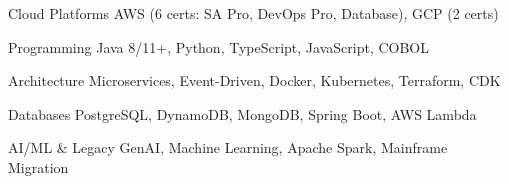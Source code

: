 \vspace{-1mm}
\begin{cvskills}

  \cvskill
  {Cloud Platforms} %
  {AWS (6 certs: SA Pro, DevOps Pro, Database), GCP (2 certs)} %
  
  \cvskill
  {Programming} %
  {Java 8/11+, Python, TypeScript, JavaScript, COBOL} %
  
  \cvskill
  {Architecture} %
  {Microservices, Event-Driven, Docker, Kubernetes, Terraform, CDK} %

  \cvskill
  {Databases} %
  {PostgreSQL, DynamoDB, MongoDB, Spring Boot, AWS Lambda} %

  \cvskill
  {AI/ML \& Legacy} %
  {GenAI, Machine Learning, Apache Spark, Mainframe Migration} %

\end{cvskills}
